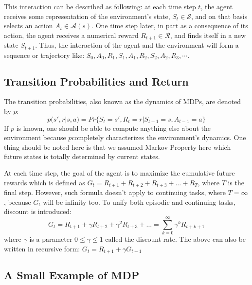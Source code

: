 \documentclass[twoside]{article}
\begin{document}
This interaction can be described as following: at each time step $t$, the agent receives some representation of the environment's state, $S_t\in\mathcal{S}$, and on that basis selects an action $A_t\in\mathcal{A}(s)$. One time step later, in part as a consequence of its action, the agent receives a numerical reward $R_{t+1}\in\mathcal{R}$, and finds itself in a new state $S_{t+1}$. Thus, the interaction of the agent and the environment will form a sequence or trajectory like: $S_0, A_0, R_1, S_1, A_1, R_2, S_2, A_2, R_3, \cdots$.

\subsection{Transition Probabilities and Return}
The transition probabilities, also known as the dynamics of MDPs, are denoted by $p$:
$$
p(s',r|s,a)=Pr\{S_t=s', R_t=r|S_{t-1}=s, A_{t-1}=a\}
$$
If $p$ is known, one should be able to compute anything else about the environment because $ p $completely characterizes the environment's dynamics. One thing should be noted here is that we assumed Markov Property here which future states is totally determined by current states.

At each time step, the goal of the agent is to maximize the cumulative future rewards which is defined as $G_t = R_{t+1} + R_{t+2} + R_{t+3} + \dots + R_T$, where $T$ is the final step. However, such formula doesn't apply to continuing tasks, where $T=\infty$, because $G_t$ will be infinity too. To unify both episodic and continuing tasks, discount is introduced:
$$
G_t = R_{t+1} + \gamma R_{t+2} + \gamma^2 R_{t+3} + \dots = \sum^\infty_{k=0}\gamma^kR_{t+k+1}
$$
where $\gamma$ is a parameter $0 \leq \gamma \leq 1$ called the discount rate. The above can also be written in recursive form: $G_t=R_{t+1}+\gamma G_{t+1}$


\subsection{A Small Example of MDP}
\end{document}
